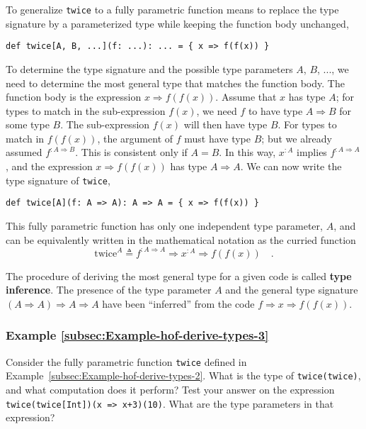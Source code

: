 To generalize \lstinline!twice! to a fully parametric function means
to replace the type signature by a parameterized type while keeping
the function body unchanged,
\begin{lstlisting}
def twice[A, B, ...](f: ...): ... = { x => f(f(x)) }
\end{lstlisting}
 To determine the type signature and the possible type parameters
$A$, $B$, ..., we need to determine the most general type that matches
the function body. The function body is the expression $x\Rightarrow f(f(x))$.
Assume that $x$ has type $A$; for types to match in the sub-expression
$f(x)$, we need $f$ to have type $A\Rightarrow B$ for some type
$B$. The sub-expression $f(x)$ will then have type $B$. For types
to match in $f(f(x))$, the argument of $f$ must have type $B$;
but we already assumed $f^{:A\Rightarrow B}$. This is consistent
only if $A=B$. In this way, $x^{:A}$ implies $f^{:A\Rightarrow A}$,
and the expression $x\Rightarrow f(f(x))$ has type $A\Rightarrow A$.
We can now write the type signature of \lstinline!twice!,
\begin{lstlisting}
def twice[A](f: A => A): A => A = { x => f(f(x)) }
\end{lstlisting}
This fully parametric function has only one independent type parameter,
$A$, and can be equivalently written in the mathematical notation
as the curried function
\begin{equation}
\text{twice}^{A}\triangleq f^{:A\Rightarrow A}\Rightarrow x^{:A}\Rightarrow f(f(x))\quad.\label{eq:hof-def-of-twice-in-math-notation}
\end{equation}

The procedure of deriving the most general type for a given code is
called \textbf{type inference}. The presence
of the type parameter $A$ and the general type signature $\left(A\Rightarrow A\right)\Rightarrow A\Rightarrow A$
have been ``inferred'' from the code $f\Rightarrow x\Rightarrow f(f(x))$.

\subsubsection{Example \label{subsec:Example-hof-derive-types-3}\ref{subsec:Example-hof-derive-types-3}}

Consider the fully parametric function \lstinline!twice! defined
in Example~\ref{subsec:Example-hof-derive-types-2}. What is the
type of \lstinline!twice(twice)!, and what computation does it perform?
Test your answer on the expression \lstinline!twice(twice[Int])(x => x+3)(10)!.
What are the type parameters in that expression?

